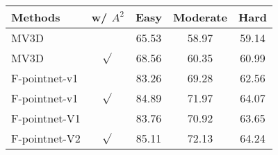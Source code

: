 \documentclass{article}
\begin{document}
\thispagestyle{empty}
\begin{table}[htbp]
    \centering
    \begin{tabular}{lcccc}
    \hline 
    Methods & w/ $A^{2}$ & Easy & Moderate & Hard \\
    \hline 
    MV3D  &       & 65.53 & 58.97 & 59.14 \\ 
    MV3D & $\sqrt{ }$ & 68.56 & 60.35 & 60.99 \\ 
    \hline 
    F-pointnet-v1 & & 83.26 & 69.28 & 62.56 \\ 
    F-pointnet-v1 & $\sqrt{ }$ & 84.89 & 71.97 & 64.07 \\ 
    \hline 
    F-pointnet-V1 & & 83.76 & 70.92 & 63.65 \\ 
    F-pointnet-V2  & $\sqrt{ }$ & 85.11 & 72.13 & 64.24 \\ 
    \hline
    \end{tabular}
  \end{table}%
  
\end{document}
